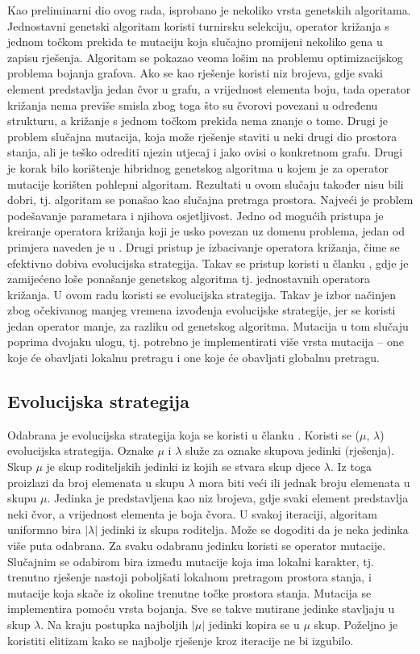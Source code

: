 \documentclass[times, utf8, diplomski, numeric]{fer}
\begin{document}
Kao preliminarni dio ovog rada, isprobano je nekoliko vrsta genetskih algoritama. Jednostavni genetski algoritam koristi turnirsku selekciju, operator križanja s jednom točkom prekida te mutaciju koja slučajno promijeni nekoliko gena u zapisu rješenja. Algoritam se pokazao veoma lošim na problemu optimizacijskog problema bojanja grafova. Ako se kao rješenje koristi niz brojeva, gdje svaki element predstavlja jedan čvor u grafu, a vrijednost elementa boju, tada operator križanja nema previše smisla zbog toga što su čvorovi povezani u određenu strukturu, a križanje s jednom točkom prekida nema znanje o tome. Drugi je problem slučajna mutacija, koja može rješenje staviti u neki drugi dio prostora stanja, ali je teško odrediti njezin utjecaj i jako ovisi o konkretnom grafu. Drugi je korak bilo korištenje hibridnog genetskog algoritma u kojem je za operator mutacije korišten pohlepni algoritam. Rezultati u ovom slučaju također nisu bili dobri, tj. algoritam se ponašao kao slučajna pretraga prostora. Najveći je problem podešavanje parametara i njihova osjetljivost. Jedno od mogućih pristupa je kreiranje operatora križanja koji je usko povezan uz domenu problema, jedan od primjera naveden je u \cite{lit17}. Drugi pristup je izbacivanje operatora križanja, čime se efektivno dobiva evolucijska strategija. Takav se pristup koristi u članku \cite{lit12}, gdje je zamijećeno loše ponašanje genetskog algoritma tj. jednostavnih operatora križanja. U ovom radu koristi se evolucijska strategija. Takav je izbor načinjen zbog očekivanog manjeg vremena izvođenja evolucijske strategije, jer se koristi jedan operator manje, za razliku od genetskog algoritma. Mutacija u tom slučaju poprima dvojaku ulogu, tj. potrebno je implementirati više vrsta mutacija -- one koje će obavljati lokalnu pretragu i one koje će obavljati globalnu pretragu.

\subsection{Evolucijska strategija}

Odabrana je evolucijska strategija koja se koristi u članku \cite{lit17}. Koristi se ($\mu$, $\lambda$) evolucijska strategija. Oznake $\mu$ i $\lambda$ služe za oznake skupova jedinki (rješenja). Skup $\mu$ je skup roditeljskih jedinki iz kojih se stvara skup djece $\lambda$. Iz toga proizlazi da broj elemenata u skupu $\lambda$ mora biti veći ili jednak broju elemenata u skupu $\mu$. Jedinka je predstavljena kao niz brojeva, gdje svaki element predstavlja neki čvor, a vrijednost elementa je boja čvora. U svakoj iteraciji, algoritam uniformno bira $|\lambda|$ jedinki iz skupa roditelja. Može se dogoditi da je neka jedinka više puta odabrana. Za svaku odabranu jedinku koristi se operator mutacije. Slučajnim se odabirom bira između mutacije koja ima lokalni karakter, tj. trenutno rješenje nastoji poboljšati lokalnom pretragom prostora stanja, i mutacije koja skače iz okoline trenutne točke prostora stanja. Mutacija se implementira pomoću vrsta bojanja. Sve se takve mutirane jedinke stavljaju u skup $\lambda$. Na kraju postupka najboljih $|\mu|$ jedinki kopira se u $\mu$ skup. Poželjno je koristiti elitizam kako se najbolje rješenje kroz iteracije ne bi izgubilo.
\end{document}
